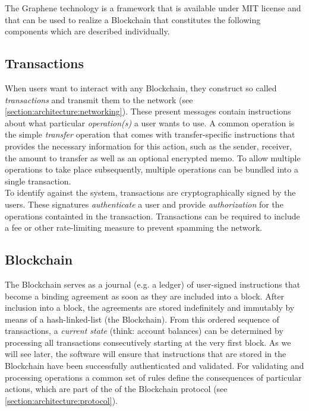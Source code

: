 The Graphene technology is a framework that is available under MIT license and that can be used to realize a Blockchain that constitutes the following components which are described
individually.

\subsection{ Transactions }
\label{section:architecture:transactions}

When users want to interact with any Blockchain, they construct so called \emph{transactions} and transmit them to the network (see \cref{section:architecture:networking}). These present messages contain instructions about what particular \emph{operation(s)} a user wants to use. A common operation is the simple \emph{transfer} operation that comes with transfer-specific instructions that provides the necessary information for this action, such as the sender, receiver, the amount to transfer as well as an optional encrypted memo. To allow multiple operations to take place subsequently, multiple operations can be bundled into a single transaction.\\
To identify against the system, transactions are cryptographically signed by the users. These signatures \emph{authenticate} a user and provide \emph{authorization} for the operations containted in the transaction. 
Transactions can be required to include a fee or other rate-limiting measure to prevent spamming the network.

\subsection{ Blockchain }

The Blockchain serves as a journal (e.g. a ledger) of user-signed instructions that become a binding agreement as soon as they are included into a block. After inclusion into a block, the agreements are stored indefinitely and immutably by means of a hash-linked-list (the Blockchain). From this ordered sequence of transactions, a \emph{current state} (think: account balances) can be determined by processing all transactions consecutively starting at the very first block. As we will see later, the software will ensure that instructions that are stored in the Blockchain have been successfully authenticated and validated. For validating and processing operations a common set of rules define the consequences of particular actions, which are part of the of the Blockchain protocol (see \cref{section:architecture:protocol}).

